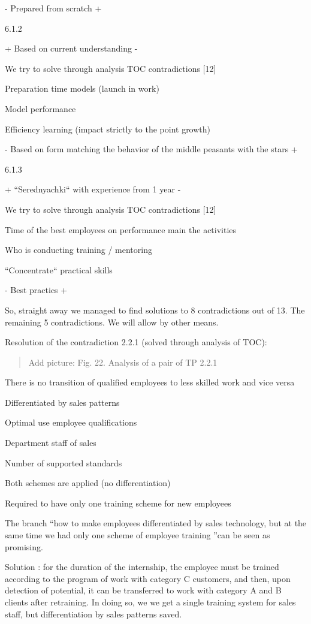\documentclass[11pt,a4paper]{book}
\newcommand{\addpicture}[1]{
  \begin{quote} Add picture: #1\end{quote}
}
\begin{document}
- Prepared from scratch +

6.1.2

+ Based on current understanding -

We try to solve through analysis TOC contradictions [12]

Preparation time models (launch in work)

Model performance

Efficiency learning (impact strictly to the point growth)

- Based on form matching the behavior of the middle peasants with the stars +

6.1.3

+ “Serednyachki“ with experience from 1 year -

We try to solve through analysis TOC contradictions [12]

Time of the best employees on performance main the activities

Who is conducting training / mentoring

“Concentrate“ practical skills

- Best practics +


So, straight away we managed to find solutions to 8 contradictions out of
13. The remaining 5 contradictions.  We will allow by other means.

Resolution of the contradiction 2.2.1 (solved through analysis of TOC):


\addpicture{Fig. 22. Analysis of a pair of TP 2.2.1}

There is no transition of qualified employees to less skilled work and vice
versa

Differentiated by sales patterns

Optimal use employee qualifications

Department staff of sales

Number of supported standards

Both schemes are applied (no differentiation)

Required to have only one training scheme for new employees


The branch “how to make employees differentiated by sales technology, but at
the same time we had only one scheme of employee training ”can be seen as
promising.

Solution : for the duration of the internship, the employee must be trained
according to the program of work with category C customers, and then, upon
detection of potential, it can be transferred to work with category A and B
clients after retraining. In doing so, we we get a single training system for
sales staff, but differentiation by sales patterns saved.
\end{document}

